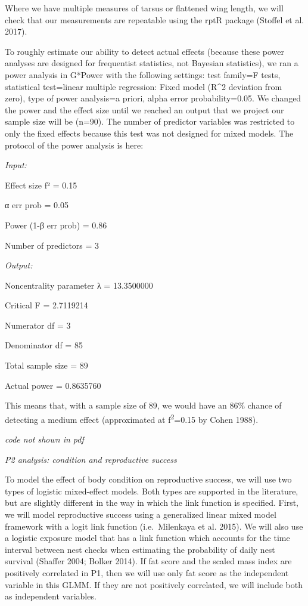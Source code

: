 \documentclass[
]{article}
\begin{document}
Where we have multiple measures of tarsus or flattened wing length, we
will check that our measurements are repeatable using the rptR package
(Stoffel et al. 2017).

To roughly estimate our ability to detect actual effects (because these
power analyses are designed for frequentist statistics, not Bayesian
statistics), we ran a power analysis in G*Power with the following
settings: test family=F tests, statistical test=linear multiple
regression: Fixed model (R\^{}2 deviation from zero), type of power
analysis=a priori, alpha error probability=0.05. We changed the power
and the effect size until we reached an output that we project our
sample size will be (n=90). The number of predictor variables was
restricted to only the fixed effects because this test was not designed
for mixed models. The protocol of the power analysis is here:

\emph{Input:}

Effect size f² = 0.15

α err prob = 0.05

Power (1-β err prob) = 0.86

Number of predictors = 3

\emph{Output:}

Noncentrality parameter λ = 13.3500000

Critical F = 2.7119214

Numerator df = 3

Denominator df = 85

Total sample size = 89

Actual power = 0.8635760

This means that, with a sample size of 89, we would have an 86\% chance
of detecting a medium effect (approximated at f\textsuperscript{2}=0.15
by Cohen 1988).

\emph{code not shown in pdf}

\emph{P2 analysis: condition and reproductive success}

To model the effect of body condition on reproductive success, we will
use two types of logistic mixed-effect models. Both types are supported
in the literature, but are slightly different in the way in which the
link function is specified. First, we will model reproductive success
using a generalized linear mixed model framework with a logit link
function (i.e.~Milenkaya et al. 2015). We will also use a logistic
exposure model that has a link function which accounts for the time
interval between nest checks when estimating the probability of daily
nest survival (Shaffer 2004; Bolker 2014). If fat score and the scaled
mass index are positively correlated in P1, then we will use only fat
score as the independent variable in this GLMM. If they are not
positively correlated, we will include both as independent variables.
\end{document}
